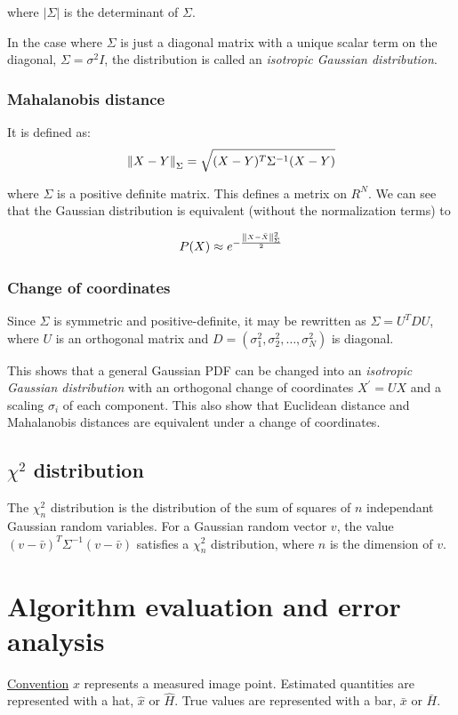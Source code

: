 where $|\Sigma|$ is the determinant of $\Sigma$.

In the case where $\Sigma$ is just a diagonal matrix with a unique scalar term on the diagonal, $\Sigma=\sigma^2 I$, the distribution is called an \textit{isotropic Gaussian distribution}.

\subsubsection{Mahalanobis distance}

It is defined as:
\begin{equation}
    \left\lVert X - Y\right\rVert_{\Sigma}=\sqrt{(X-Y)^T \Sigma^{-1} (X-Y)}
\end{equation}{}

where $\Sigma$ is a positive definite matrix. This defines a metrix on $R^N$.
We can see that the Gaussian distribution is equivalent (without the normalization terms) to 

\begin{equation}
    P(X) \approx e^{-\frac{\left\lVert X-\bar{X}\right\rVert_{\Sigma}^{2}}{2}}
\end{equation}{}

\subsubsection{Change of coordinates}
Since $\Sigma$ is symmetric and positive-definite, it may be rewritten as $\Sigma=U^T D U$, where $U$ is an orthogonal matrix and $D=(\sigma_1^2, \sigma_2^2, \dots, \sigma_N^2)$ is diagonal.

This shows that a general Gaussian PDF can be changed into an \textit{isotropic Gaussian distribution} with an orthogonal change of coordinates $X^\prime = UX$ and a scaling $\sigma_i$ of each component.
This also show that Euclidean distance and Mahalanobis distances are equivalent under a change of coordinates.

\subsection{$\chi^2$ distribution}

The $\chi_n^2$ distribution is the distribution of the sum of squares of $n$ independant Gaussian random variables. For a Gaussian random vector $v$, the value ${(v-\bar{v})^T \Sigma^{-1} (v-\bar{v})}$ satisfies a $\chi_n^2$ distribution, where $n$ is the dimension of $v$.



\section{Algorithm evaluation and error analysis}
\underline{Convention}
$x$ represents a measured image point.
Estimated quantities are represented with a hat, $\hat{x}$ or $\hat{H}$.
True values are represented with a bar, $\bar{x}$ or $\bar{H}$.

